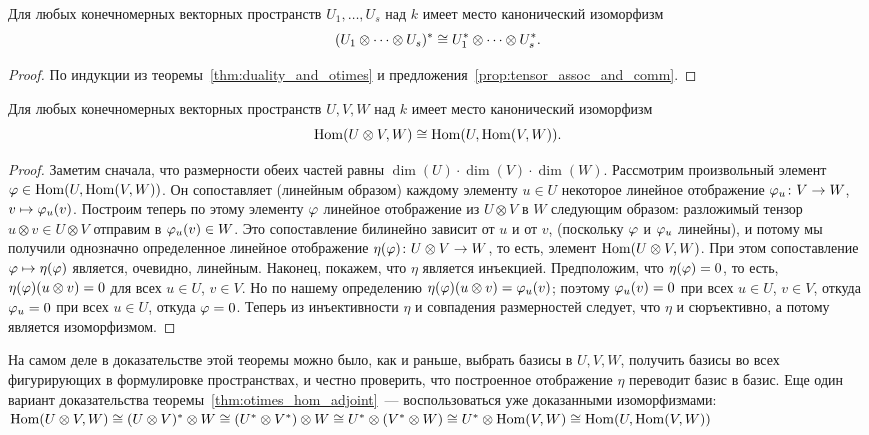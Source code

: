 \begin{corollary}
Для любых конечномерных векторных пространств $U_1,\dots,U_s$ над $k$
имеет место канонический изоморфизм
$$
(U_1\otimes\dots\otimes U_s)^*\cong U_1^*\otimes\dots\otimes U_s^*.
$$
\end{corollary}
\begin{proof}
По индукции из теоремы~\ref{thm:duality_and_otimes} и
предложения~\ref{prop:tensor_assoc_and_comm}.
\end{proof}

\begin{theorem}\label{thm:otimes_hom_adjoint}
Для любых конечномерных векторных пространств $U,V,W$ над $k$ имеет
место канонический изоморфизм
$$
\operatorname{Hom}(U\otimes V,W)\cong\operatorname{Hom}(U,\operatorname{Hom}(V,W)).
$$
\end{theorem}
\begin{proof}
Заметим сначала, что размерности обеих частей равны
$\dim(U)\cdot\dim(V)\cdot\dim(W)$. Рассмотрим произвольный элемент
$\varphi\in\operatorname{Hom}(U,\operatorname{Hom}(V,W))$. Он сопоставляет (линейным образом)
каждому элементу $u\in U$ некоторое линейное отображение
$\varphi_u\colon V\to W$, $v\mapsto\varphi_u(v)$. Построим теперь по этому
элементу $\varphi$ линейное отображение из $U\otimes V$ в $W$ следующим
образом: разложимый тензор $u\otimes v\in U\otimes V$ отправим в
$\varphi_u(v)\in W$. Это сопоставление билинейно зависит от $u$ и от $v$,
(поскольку $\varphi$ и $\varphi_u$ линейны), и потому мы получили однозначно
определенное линейное отображение $\eta(\varphi)\colon U\otimes V\to W$,
то есть, элемент $\operatorname{Hom}(U\otimes V, W)$. При этом сопоставление
$\varphi\mapsto\eta(\varphi)$ является, очевидно, линейным.
Наконец, покажем, что $\eta$ является инъекцией. Предположим, что
$\eta(\varphi)=0$, то есть, $\eta(\varphi)(u\otimes v)=0$ для всех $u\in U$,
$v\in V$. Но по нашему определению $\eta(\varphi)(u\otimes v) = \varphi_u(v)$;
поэтому $\varphi_u(v)=0$ при всех $u\in U$, $v\in V$, откуда $\varphi_u=0$ при
всех $u\in U$, откуда $\varphi=0$.
Теперь из инъективности $\eta$ и совпадения размерностей следует, что
$\eta$ и сюръективно, а потому является изоморфизмом.
\end{proof}

На самом деле в доказательстве этой теоремы можно было, как и раньше,
выбрать базисы в $U,V,W$, получить базисы во всех фигурирующих в
формулировке пространствах, и честно проверить, что построенное
отображение $\eta$ переводит базис в базис. Еще один вариант
доказательства теоремы~\ref{thm:otimes_hom_adjoint}~---
воспользоваться уже доказанными изоморфизмами:
$\operatorname{Hom}(U\otimes V,W)\cong (U\otimes V)^*\otimes W\cong
(U^*\otimes V^*)\otimes W\cong U^*\otimes(V^*\otimes W)
\cong U^*\otimes\operatorname{Hom}(V,W) \cong\operatorname{Hom}(U,\operatorname{Hom}(V,W))$

